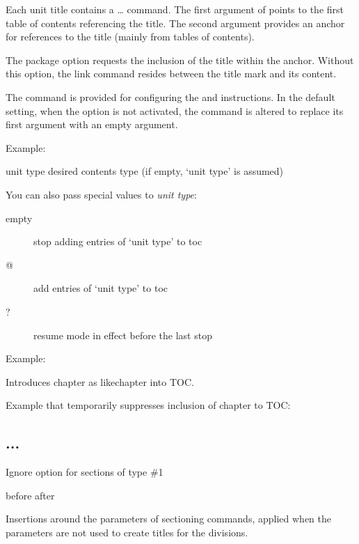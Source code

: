 Each unit title contains a \marg{\ldots}\marg{\ldots}\ldots{} command.
The first argument of  points to the first table of contents
referencing the title. The second argument provides an anchor
for references to the title (mainly from tables of contents).

The package option  requests the inclusion of the
title within the anchor.  Without this option, the link command
resides between the title mark and its content.

The  command is provided for configuring
the  and  instructions.  In the default setting,
when the  option is not activated, the 
command is altered to replace its first argument with an empty
argument.

Example:

\begin{texsource}
     {\Link}
     {\ifx \TitleMark\sectionHMark
        \EndLink
        \TitleMark\space
      \else \EndLink \fi
     }
  \def\up{[up]}
\end{texsource}

{unit type}
{desired contents type  (if empty, `unit type' is assumed)}\EndDoc

You can also pass special values to \textit{unit type}:

\begin{description}
  \item[empty] stop adding entries of `unit type' to toc
  \item[@] add entries of `unit type' to toc
   \item[?] resume mode in effect before the last stop
\end{description}

Example: 
\begin{texsource}
\end{texsource}

Introduces chapter as likechapter into TOC.

Example that temporarily suppresses inclusion of chapter to TOC:

\begin{texsource}
\chapter{...}
\end{texsource}


Ignore option  for sections of type \#1


 {before} {after}\EndDoc

Insertions around the parameters of sectioning commands, applied when
the parameters are not used to create titles for the divisions.
